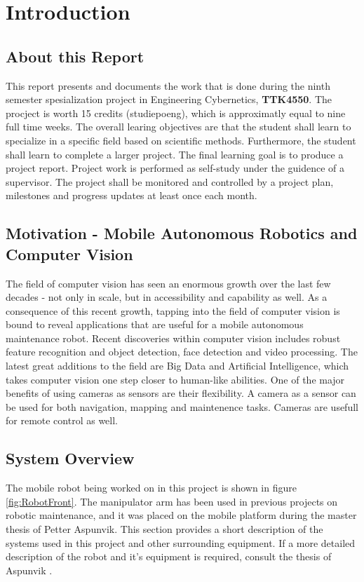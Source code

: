\chapter{Introduction}
\label{chp:introduction} 

\section{About this Report}

This report presents and documents the work that is done during the ninth semester spesialization project in Engineering Cybernetics, \textbf{TTK4550}. The procject is worth 15 credits (studiepoeng), which is approximatly equal to nine full time weeks. The overall learing objectives are that the student shall learn to specialize in a specific field based on scientific methods. Furthermore, the student shall learn to complete a larger project. The final learning goal is to produce a project report. Project work is performed as self-study under the guidence of a supervisor. The project shall be monitored and controlled by a project plan, milestones and progress updates at least once each month.

\section{Motivation - Mobile Autonomous Robotics and Computer Vision}

The field of computer vision has seen an enormous growth over the last few decades - not only in scale, but in accessibility and capability as well. As a consequence of this recent growth, tapping into the field of computer vision is bound to reveal applications that are useful for a mobile autonomous maintenance robot. Recent discoveries within computer vision includes robust feature recognition and object detection, face detection and video processing. The latest great additions to the field are Big Data and Artificial Intelligence, which takes computer vision one step closer to human-like abilities. One of the major benefits of using cameras as sensors are their flexibility. A camera as a sensor can be used for both navigation, mapping and maintenence tasks. Cameras are usefull for remote control as well.  

\section{System Overview}

The mobile robot being worked on in this project is shown in figure \ref{fig:RobotFront}. The manipulator arm  has been used in previous projects on robotic maintenance, and it was placed on the mobile platform during the master thesis of Petter Aspunvik. This section provides a short description of the systems used in this project and other surrounding equipment. If a more detailed description of the robot and it's equipment is required, consult the thesis of Aspunvik \cite{aspunvik}.

